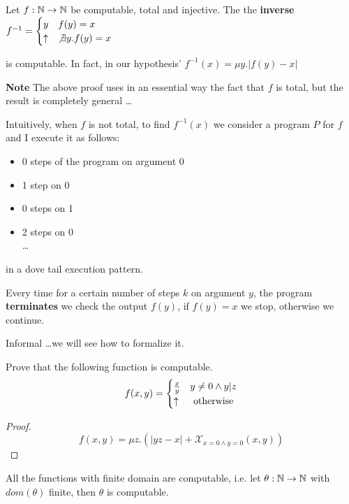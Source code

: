 \begin{exercise}
  Let $f:\mathbb{N}\rightarrow\mathbb{N}$ be computable, total and injective. The
  the \textbf{inverse} $f^{-1} = \begin{cases}
    y        & f(y) = x                \\
    \uparrow & \not\exists y. f(y) = x
\end{cases}$

is computable. In fact, in our hypothesis' $f^{-1}(x) = \mu y. |f(y)-x|$
\end{exercise}

\textbf{Note} The above proof uses in an essential way the fact that $f$ is total, but the result is completely general \dots

Intuitively, when $f$ is not total, to find $f^{-1}(x)$ we consider a program $P$ for $f$ and I execute it as follows:
\begin{itemize}
\item 0 steps of the program on argument 0
\item 1 step on 0
\item 0 steps on 1
\item 2 steps on 0\\
  \dots
\end{itemize}

in a dove tail execution pattern.

Every time for a certain number of steps $k$ on argument $y$, the program \textbf{terminates} we check the output $f(y)$, if $f(y) = x$ we stop, otherwise we continue.

Informal \dots we will see how to formalize it.

\begin{exercise}
  Prove that the following function is computable.
  \[f(x,y) = \begin{cases}
    \frac{x}{y} & y\not= 0 \land y|z \\
    \uparrow    & $ otherwise $
  \end{cases}\]
  \begin{proof}
    \[ f(x,y) = \mu z. (|yz-x| + \mathcal{X}_{x=0\land y=0}(x,y)) \]
  \end{proof}
\end{exercise}


\begin{lemma}
  All the functions with finite domain are computable, i.e. let
  $\theta: \mathbb{N}\rightarrow\mathbb{N}$ with $dom(\theta)$ finite, then
  $\theta$ is computable.
\end{lemma}
  
